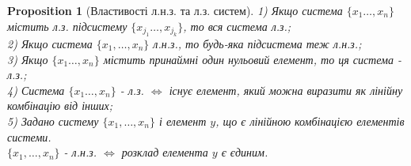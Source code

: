 \documentclass[a4paper, 10pt]{article}
\theoremstyle{theoremdd}
\newtheorem{proposition}[theorem]{Proposition}
\begin{document}
	\begin{proposition}[Властивості л.н.з. та л.з. систем]
	1) Якщо система $\{x_1 \dots, x_n\}$ містить л.з. підсистему $\{x_{j_1} \dots, x_{j_k}\}$, то вся система л.з.;\\
	2) Якщо система $\{x_1, \dots, x_n\}$ л.н.з., то будь-яка підсистема теж л.н.з.;\\
	3) Якщо $\{x_1 \dots, x_n\}$ містить принаймні один нульовий елемент, то ця система - л.з.;\\
	4) Система $\{x_1 \dots, x_n\}$ - л.з. $\iff$ існує елемент, який можна виразити як лінійну комбінацію від інших;\\
	5) Задано систему $\{x_1, \dots, x_n\}$ і елемент $y$, що є лінійною комбінацією елементів системи. \\
		$\{x_1, \dots, x_n\}$ - л.н.з. $\iff$ розклад елемента $y$ є єдиним.
	\end{proposition}
	
\end{document}
